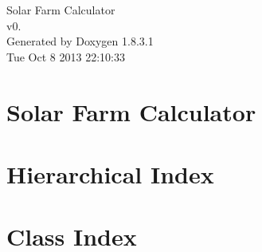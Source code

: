 \documentclass{book}
\begin{document}
\hypersetup{pageanchor=false,citecolor=blue}
\begin{titlepage}
\vspace*{7cm}
\begin{center}
{\Large Solar Farm Calculator \\[1ex]\large v0. }\\
\vspace*{1cm}
{\large Generated by Doxygen 1.8.3.1}\\
\vspace*{0.5cm}
{\small Tue Oct 8 2013 22:10:33}\\
\end{center}
\end{titlepage}
\clearemptydoublepage
{}
\tableofcontents
\clearemptydoublepage
{}
\hypersetup{pageanchor=true,citecolor=blue}
\chapter{Solar Farm Calculator}
\label{md_README}
\hypertarget{md_README}{}

\chapter{Hierarchical Index}

\chapter{Class Index}

\end{document}

